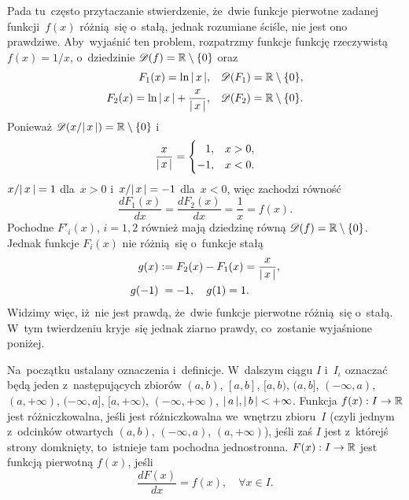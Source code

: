 \documentclass[a4paper,11pt]{article}
\begin{document}
\start {} Pada tu~często przytaczanie stwierdzenie, że~dwie
funkcje pierwotne zadanej funkcji~$f( x )$ różnią~się o~stałą, jednak
rozumiane ściśle, nie jest ono prawdziwe. Aby~wyjaśnić ten problem,
rozpatrzmy funkcje funkcję rzeczywistą $f( x ) = 1 / x$, o~dziedzinie
$\mathcal{D}( f ) = \mathbb{R} \setminus \{ 0 \}$ oraz
\begin{subequations}
  \begin{align}
    \label{eq:FichtenholzVolII-01-A}
    F_{ 1 }( x ) = \ln|\, {  x  } \,|, \quad
    & \mathcal{D}( F_{ 1 } ) = \mathbb{R} \setminus \{ 0 \}, \\
    \label{eq:FichtenholzVolII-01-B}
    F_{ 2 }( x ) = \ln|\, {  x  } \,| + \frac{ x }{ |\, {  x  } \,| }, \quad
    & \mathcal{D}( F_{ 2 } ) = \mathbb{R} \setminus \{ 0 \}.
  \end{align}
\end{subequations}
Ponieważ $\mathcal{D}( x / |\, {  x  } \,| ) = \mathbb{R} \setminus \{ 0 \}$ i
\begin{equation}
  \label{eq:FichtenholzVolII-02}
  \frac{ x }{ |\, {  x  } \,| } =
  \begin{cases}
    \hphantom{-}1, & x > 0, \\
    -1, & x < 0.
  \end{cases}
\end{equation}
$x / |\, {  x  } \,| = 1$ dla~$x > 0$ i~$x / |\, {  x  } \,| = -1$
dla~$x < 0$, więc zachodzi równość
\begin{equation}
  \label{eq:FichtenholzVolII-03}
  \frac{ d F_{ 1 }( x ) }{ dx } = \frac{ d F_{ 2 }( x ) }{ dx }
  = \frac{ 1 }{ x } = f( x ).
\end{equation}
Pochodne $F'_{ i }( x )$, $i = 1, 2$ również mają dziedzinę równą
$\mathcal{D}( f ) = \mathbb{R} \setminus \{ 0 \}$. Jednak funkcje $F_{ i }( x )$
nie różnią~się o~funkcje stałą
\begin{subequations}
  \begin{align}
    \label{eq:FichtenholzVolII-04-A}
    g( x ) &:= F_{ 2 }( x ) - F_{ 1 }( x ) = \frac{ x }{ |\, {  x  } \,| }, \\
    \label{eq:FichtenholzVolII-04-B}
    g( -1 ) &\hphantom{:}= -1, \quad g( 1 ) = 1.
  \end{align}
\end{subequations}
Widzimy więc, iż~nie jest prawdą, że~dwie funkcje pierwotne różnią~się
o~stałą. W~tym twierdzeniu kryje~się jednak ziarno prawdy, co~zostanie
wyjaśnione poniżej.

Na~początku ustalany oznaczenia i~definicje. W~dalszym ciągu $I$
i~$I_{ \iota }$ oznaczać będą jeden z~następujących zbiorów
$( a, b )$, $[ a, b ]$, $[ a, b )$, $( a, b ]$, $( -\infty, a )$,
$( a, +\infty )$, $( -\infty, a ]$, $[ a, +\infty )$,
$( -\infty, +\infty )$, $|\, {  a  } \,|, |\, {  b  } \,| < +\infty$.
Funkcja $f( x ): I \to \mathbb{R}$ jest różniczkowalna, jeśli jest
różniczkowalna we~wnętrzu zbioru~$I$ (czyli jednym z~odcinków
otwartych $( a, b )$, $( -\infty, a )$, $( a, +\infty )$), jeśli zaś
$I$ jest z~którejś strony domknięty, to~istnieje tam pochodna
jednostronna. $F( x ): I \to \mathbb{R}$ jest funkcją pierwotną $f( x )$,
jeśli
\begin{equation}
  \label{eq:FichtenholzVolII-05}
  \frac{ d F( x ) }{ dx } = f( x ), \quad \forall x \in I.
\end{equation}
\end{document}
